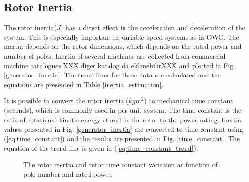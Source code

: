 \documentclass[twocolumn]{article}
\begin{document}
\subsection{Rotor Inertia}

The rotor inertia($J$) has a direct effect in the acceleration and deceleration of the system. This is especially important in variable speed systems as in OWC. The inertia depends on the rotor dimensions, which depends on the rated power and number of poles. Inertia of several machines are collected from commercial machine catalogues \cite{Siemens2012} XXX diger katalog da eklenebilirXXX and plotted in Fig. \ref{generator_inertia}. The trend lines for these data are calculated and the equations are presented in Table \ref{inertia_estimation}.

It is possible to convert the rotor inertia ($kgm^2$) to mechanical time constant (seconds), which is commonly used in per unit system.  The time constant is the ratio of rotational kinetic energy stored in the rotor to the power rating. Inertia values presented in Fig. \ref{generator_inertia} are converted to time constant using (\ref{eq:time_constant}) and the results are presented in Fig. \ref{time_constant}. The equation of the trend line is given in (\ref{eq:time_constant_trend}).


\begin{figure}[]
  \centering

    \caption{The rotor inertia and rotor time constant variation as function of pole number and rated power.} 
    \label{inertia_timeconstant}
\end{figure}
\end{document}
